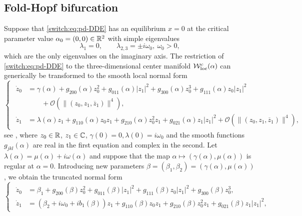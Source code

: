\subsection{Fold-Hopf bifurcation\label{switch:sec:fold-Hopf}}
Suppose that \cref{switch:eq:pd-DDE} has an equilibrium $x=0$ at the critical parameter value $\alpha_{0}=(0,0)\in \mathbb{R}^{2}$ with simple eigenvalues
\begin{equation}
\lambda_{1}=0,\qquad\lambda_{2,3}=\pm i\omega_{0},\ \omega_{0}>0,\label{switch:eq:FH_eigenvalues}
\end{equation}
which are the only eigenvalues on the imaginary axis. The restriction of \cref{switch:eq:pd-DDE} to the three-dimensional center manifold $\mathcal{W}^c_{\text{loc}}(\alpha)$ can generically be transformed to the smooth local normal form
\begin{equation}
\begin{cases}
\begin{aligned}
\dot{z}_{0} & =\gamma(\alpha)+g_{200}(\alpha)z_{0}^{2}+g_{011}(\alpha)|z_{1}|^{2}+g_{300}(\alpha)z_{0}^{3}+g_{111}(\alpha)z_{0}|z_{1}|^{2}\\
 & \qquad+\mathcal{O}\left(\|\left(z_{0},z_{1},\overline{z}_{1}\right)\|^{4}\right),\\
\dot{z}_{1} & =\lambda(\alpha)z_{1}+g_{110}(\alpha)z_{0}z_{1}+g_{210}(\alpha)z_0^2z_{1}+g_{021}(\alpha)z_{1}|z_{1}|^{2}
	+ \mathcal{O}\left(\|\left(z_{0},z_{1},\overline{z}_{1}\right)\|^{4}\right),
\end{aligned}
\end{cases}\label{switch:eq:fold-Hopf_poincare_normal_form}
\end{equation}
see \cite[\S 8.5, Lemma 8.9]{Kuznetsov2004}, where $z_{0}\in \mathbb{R}$, $z_{1}\in \mathbb{C}$, $\gamma(0)=0,\lambda(0)=i\omega_{0}$ and the smooth functions $g_{jkl}(\alpha)$ are real in the first equation and complex in the second. Let $\lambda(\alpha) =\mu(\alpha)+i\omega(\alpha)$ and suppose that the map $\alpha\mapsto(\gamma(\alpha),\mu(\alpha))$ is regular at $\alpha=0$. Introducing new parameters $\beta=(\beta_{1},\beta_{2}) = (\gamma(\alpha),\mu(\alpha))$, we obtain the truncated normal form
%
\begin{equation}
\begin{cases}
\begin{aligned}
  \dot{z}_{0} & =\beta_{1}
  +g_{200}(\beta)z_{0}^{2}+g_{011}(\beta)|z_{1}|^{2}+g_{111}(\beta)z_{0}|z_{1}|^{2}+g_{300}(\beta)z_{0}^{3},\\
  \dot{z}_{1} & =(\beta_{2}
  +i\omega_{0}+ib_1(\beta))z_{1}+g_{110}(\beta)z_{0}z_{1}+g_{210}(\beta)z_{0}^{2}z_{1}+g_{021}(\beta)z_{1}|z_{1}|^{2},
\end{aligned}
\end{cases}
\label{switch:eq:FH-nf}
\end{equation}

